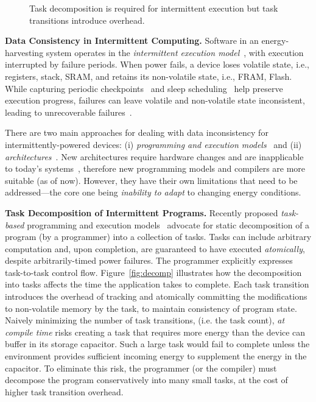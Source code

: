 \begin{figure}
    \caption{\label{fig:coalesce}Task decomposition is required for
intermittent execution but task transitions introduce overhead.}
\end{figure}


\textbf{Data Consistency in Intermittent Computing.} Software in an energy-harvesting system operates in the {\em intermittent execution model}~\cite{dino,lucia_snapl_2017}, with execution interrupted by failure periods. When power fails, a device loses volatile state, i.e., registers, stack, SRAM, and retains its non-volatile state, i.e., FRAM, Flash. While capturing periodic checkpoints~\cite{mementos,quickrecall} and sleep scheduling~\cite{dewdrop,hibernus,hibernusplusplus} help preserve execution progress, failures can leave volatile and non-volatile state inconsistent, leading to unrecoverable failures~\cite{dino,edb}. 

There are two main approaches for dealing with data inconsistency for intermittently-powered devices: (i) \emph{programming and execution models}~\cite{dino,ratchet,chain,alpaca} and (ii) \emph{architectures}~\cite{hicks_isca_2017,idetic,nvp,tictpl}. New architectures require hardware changes and are inapplicable to today's systems~\cite{hicks_isca_2017,nvp}, therefore new programming models and compilers are more suitable (as of now). However, they have their own limitations that need to be addressed---the core one being \emph{inability to adapt} to changing energy conditions.

\textbf{Task Decomposition of Intermittent Programs.} Recently proposed {\em
task-based} programming and execution models~\cite{alpaca,chain} advocate for
static decomposition of a program (by a programmer) into a collection of tasks.
Tasks can include arbitrary computation and, upon completion, are guaranteed to
have executed {\em atomically}, despite arbitrarily-timed power failures.
The programmer explicitly expresses task-to-task control flow.
%
Figure~\ref{fig:decomp} illustrates how the decomposition into tasks affects
the time the application takes to complete.
%
Each task transition introduces the overhead of tracking and atomically
committing the modifications to non-volatile memory by the task, to maintain
consistency of program state.
%
Naively minimizing the number of task transitions, (i.e. the task count),
\emph{at compile time} risks creating a task that requires more energy than the
device can buffer in its storage capacitor.
%
Such a large task would fail to complete unless the environment provides
sufficient incoming energy to supplement the energy in the capacitor.
%
To eliminate this risk, the programmer (or the compiler) must decompose the
program conservatively into many small tasks, at the cost of higher task
transition overhead.

